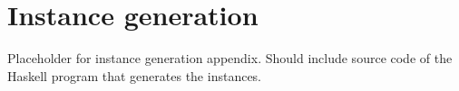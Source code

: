\section{Instance generation}
\label{app:generate}
Placeholder for instance generation appendix. Should include source code of the Haskell program that generates the instances.
